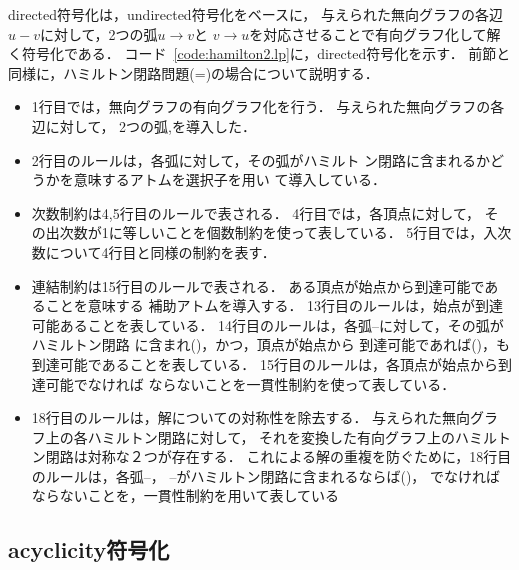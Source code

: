 \textsf{directed}符号化は，\textsf{undirected}符号化をベースに，
与えられた無向グラフの各辺$u-v$に対して，2つの弧$u\rightarrow v$と
$v\rightarrow u$を対応させることで有向グラフ化して解く符号化である．
コード~\ref{code:hamilton2.lp}に，\textsf{directed}符号化を示す．
前節と同様に，ハミルトン閉路問題(=)の場合について説明する．

\begin{itemize}
\item 1行目では，無向グラフの有向グラフ化を行う．
  与えられた無向グラフの各辺に対して，
  2つの弧,を導入した．
\item 2行目のルールは，各弧に対して，その弧がハミルト
  ン閉路に含まれるかどうかを意味するアトムを選択子を用い
  て導入している．
\item 次数制約は4,5行目のルールで表される．
  4行目では，各頂点に対して，
  その出次数が1に等しいことを個数制約を使って表している．
  5行目では，入次数について4行目と同様の制約を表す．
\item 連結制約は15行目のルールで表される．
  ある頂点が始点から到達可能であることを意味する
  補助アトムを導入する．
  13行目のルールは，始点が到達可能あることを表している．
  14行目のルールは，各弧--に対して，その弧がハミルトン閉路
  に含まれ()，かつ，頂点が始点から
  到達可能であれば()，も到達可能であることを表している．
  15行目のルールは，各頂点が始点から到達可能でなければ
  ならないことを一貫性制約を使って表している．
\item 18行目のルールは，解についての対称性を除去する．
  与えられた無向グラフ上の各ハミルトン閉路に対して，
  それを変換した有向グラフ上のハミルトン閉路は対称な２つが存在する．
  これによる解の重複を防ぐために，18行目のルールは，各弧--，
  --がハミルトン閉路に含まれるならば()，
  でなければならないことを，一貫性制約を用いて表している
\end{itemize}

\subsection{\textsf{acyclicity}符号化}



